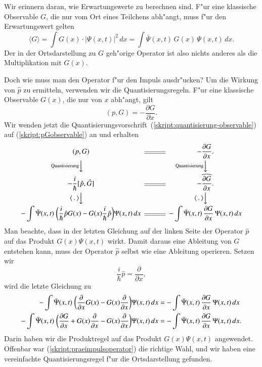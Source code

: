Wir erinnern daran, wie Erwartungswerte zu berechnen sind.
F"ur eine klassische  Observable $G$, die nur vom Ort eines Teilchens abh"angt,
muss f"ur den Erwartungswert gelten
\[
\langle G\rangle = \int G(x)\cdot |\Psi(x,t)|^2\,dx
=
\int\bar\Psi(x,t)\,G(x)\,\Psi(x,t)\,dx.
\]
Der in der Ortsdarstellung zu $G$ geh"orige Operator ist also nichts
anderes als die Multiplikation mit $G(x)$.

Doch wie muss man den Operator f"ur den Impuls ausdr"ucken?
Um die Wirkung von $\hat p$ zu ermitteln, verwenden wir die
Quantisierungsregeln.
F"ur eine klassische Observable $G(x)$, die nur von $x$
abh"angt, gilt
\begin{equation}
(p,G)=-\frac{\partial G}{\partial x}.
\label{skript:pGobservable}
\end{equation}
Wir wenden jetzt die
Quantisierungsvorschrift~(\ref{skript:quantisierung-observable})
auf (\ref{skript:pGobservable}) an und erhalten
\[
\begin{CD}
\displaystyle(p,G)     @=   \displaystyle-\frac{\partial G}{\partial x}.\\
@V\text{Quantisierung}VV           @V\text{Quantisierung}VV   \\
\displaystyle-\frac{i}{\hbar}[\hat p,\hat G]
@=
\displaystyle-\widehat{\frac{\partial G}{\partial x}}.\\
@V\textstyle\langle\,.\,\rangle VV           @V\textstyle\langle\,.\,\rangle VV   \\
\displaystyle -\int \bar\Psi(x,t)\;\biggl(\frac{i}{\hbar}\hat p G(x)-G(x)\frac{i}{\hbar}\hat p\biggr)\Psi(x,t)\,dx
@=
\displaystyle -\int \bar \Psi(x,t)\,\frac{\partial G}{\partial x}\,\Psi(x,t)\,dx
\end{CD}
\]
Man beachte, dass in der letzten Gleichung auf der linken Seite der Operator
$\hat p$ auf das Produkt $G(x)\Psi(x,t)$ wirkt.
Damit daraus eine Ableitung von $G$ entstehen kann, muss der Operator
$\hat p$ selbst wie eine Ableitung operieren. Setzen wir
\begin{equation}
\frac{i}{\hbar}\hat p = \frac{\partial}{\partial x},
\label{skript:praeimpulsoperator}
\end{equation}
wird die letzte Gleichung zu
\begin{align}
-\int \bar\Psi(x,t)\;\biggl(\frac{\partial}{\partial x}G(x)-G(x)\frac{\partial}{\partial x}\biggr)\Psi(x,t)\,dx
&=
-\int \bar \Psi(x,t)\,\frac{\partial G}{\partial x}\,\Psi(x,t)\,dx
\notag
\\
-\int \bar\Psi(x,t)\;\biggl(
\frac{\partial G}{\partial x}
+
G(x)\frac{\partial}{\partial x}
-G(x)\frac{\partial}{\partial x}\biggr)\Psi(x,t)\,dx
&=
-\int \bar \Psi(x,t)\,\frac{\partial G}{\partial x}\,\Psi(x,t)\,dx.
\label{skript:produktregelpG}
\end{align}
Darin haben wir die Produktregel auf das Produkt $G(x)\Psi(x,t)$ angewendet.
Offenbar war (\ref{skript:praeimpulsoperator}) die richtige Wahl, und wir
haben eine vereinfachte Quantisierungsregel f"ur die Ortsdarstellung
gefunden.

